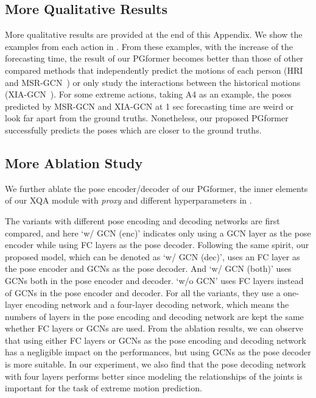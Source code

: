 \documentclass[10pt,twocolumn,letterpaper]{article}
\begin{document}
\subsection{More Qualitative Results}
\label{app_subsec:qualitative}
More qualitative results are provided at the end of this Appendix. 
We show the examples from each action in .
From these examples, with the increase of the forecasting time, the result of our PGformer becomes better than those of other compared methods that independently predict the motions of each person (HRI~\cite{mao2020history} and MSR-GCN~\cite{dang2021msr}) or only study the interactions between the historical motions (XIA-GCN~\cite{guo2021multi}).
For some extreme actions, taking A4 as an example, the poses predicted by MSR-GCN and XIA-GCN at 1 sec forecasting time are weird or look far apart from the ground truths. 
Nonetheless, our proposed PGformer successfully predicts the poses which are closer to the ground truths. 


\subsection{More Ablation Study}
\label{app_subsec:ablation}


We further ablate the pose encoder/decoder of our PGformer, the inner elements of our XQA module with \textit{proxy} and different hyperparameters in . 

The variants with different pose encoding and decoding networks are first compared, and here `w/ GCN (enc)' indicates only using a GCN layer as the pose encoder while using FC layers as the pose decoder. 
Following the same spirit, our proposed model, which can be denoted as `w/ GCN (dec)', uses an FC layer as the pose encoder and GCNs as the pose decoder.
And `w/ GCN (both)' uses GCNs both in the pose encoder and decoder. 
`w/o GCN' uses FC layers instead of GCNs in the pose encoder and decoder.
For all the variants, they use a one-layer encoding network and a four-layer decoding network, which means the numbers of layers in the pose encoding and decoding network are kept the same whether FC layers or GCNs are used.
From the ablation results, we can observe that using either FC layers or GCNs as the pose encoding and decoding network has a negligible impact on the performances, but using GCNs as the pose decoder is more suitable. 
In our experiment, we also find that the pose decoding network with four layers performs better since modeling the relationships of the joints is important for the task of extreme motion prediction.
\end{document}
